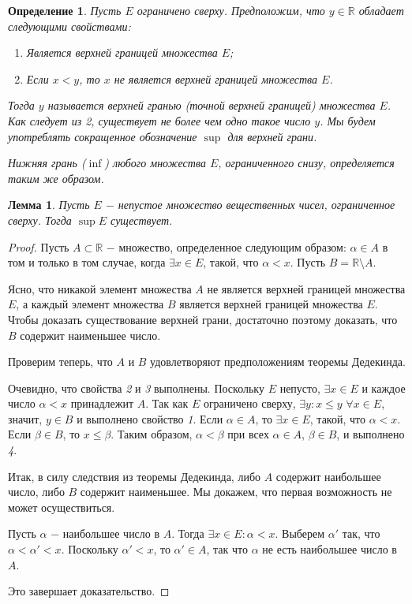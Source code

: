 \documentclass{article}
\newtheorem*{lemma}{Лемма}
\newtheorem{definition}{Определение}[section]
\begin{document}
\begin{definition}

Пусть \(E\) ограничено сверху. Предположим, что \(y \in \mathbb{R}\) обладает следующими свойствами:

\begin{enumerate}
    \item Является верхней границей множества \(E\);
    \item Если \(x < y\), то \(x\) не является верхней границей множества \(E\).
\end{enumerate}

Тогда \(y\) называется верхней гранью (точной верхней границей) множества \(E\). Как следует из 2, существует не более чем одно такое число \(y\). Мы будем употреблять сокращенное обозначение \(\sup\) для верхней грани.

Нижняя грань (\(\inf\)) любого множества \(E\), ограниченного снизу, определяется таким же образом.

\end{definition}

\begin{lemma}
Пусть \(E\) \(-\) непустое множество вещественных чисел, ограниченное сверху. Тогда \(\sup E\) существует.
\end{lemma}

\begin{proof}
Пусть \(A \subset \mathbb{R}\) \(-\) множество, определенное следующим образом: \(\alpha \in A\) в том и только в том случае, когда \(\exists x \in E\), такой, что \(\alpha < x\). Пусть \(B = \mathbb{R} \setminus A\).

Ясно, что никакой элемент множества \(A\) не является верхней границей множества \(E\), а каждый элемент множества \(B\) является верхней границей множества \(E\). Чтобы доказать существование верхней грани, достаточно поэтому доказать, что \(B\) содержит наименьшее число.

Проверим теперь, что \(A\) и \(B\) удовлетворяют предположениям теоремы Дедекинда.

Очевидно, что свойства \textit{2} и \textit{3} выполнены. Поскольку \(E\) непусто, \(\exists x \in E\) и каждое число \(\alpha < x\) принадлежит \(A\). Так как \(E\) ограничено сверху, \(\exists y : x \leq y\) \(\forall x \in E\), значит, \(y \in B\) и выполнено свойство \textit{1}. Если \(\alpha \in A\), то \(\exists x \in E\), такой, что \(\alpha < x\). Если \(\beta \in B\), то \(x \leq \beta\). Таким образом, \(\alpha < \beta\) при всех \(\alpha \in A\), \(\beta \in B\), и выполнено \textit{4}.

Итак, в силу следствия из теоремы Дедекинда, либо \(A\) содержит наибольшее число, либо \(B\) содержит наименьшее. Мы докажем, что первая возможность не может осуществиться.

Пусть \(\alpha\) \(-\) наибольшее число в \(A\). Тогда \(\exists x \in E : \alpha < x\). Выберем \(\alpha'\) так, что \(\alpha < \alpha' < x\). Поскольку \(\alpha' < x\), то \(\alpha' \in A\), так что \(\alpha\) не есть наибольшее число в \(A\).

Это завершает доказательство.
\end{proof}
\end{document}
